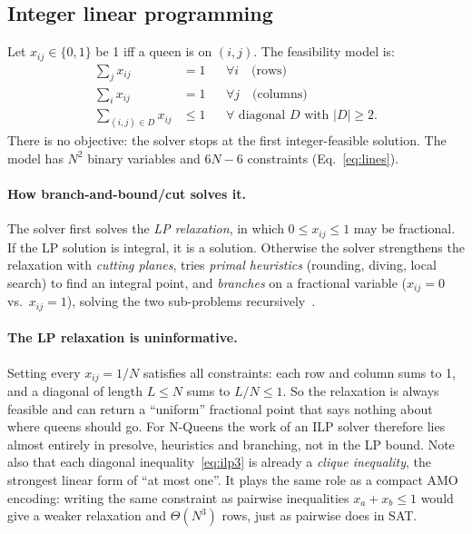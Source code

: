 \subsection{Integer linear programming}
Let $x_{ij}\in\{0,1\}$ be 1 iff a queen is on $(i,j)$. The feasibility model is:
\begin{align}
  \textstyle\sum_{j} x_{ij} &= 1 && \forall i \quad\text{(rows)}\label{eq:ilp1}\\
  \textstyle\sum_{i} x_{ij} &= 1 && \forall j \quad\text{(columns)}\\
  \textstyle\sum_{(i,j)\in D} x_{ij} &\le 1 && \forall \text{ diagonal } D \text{ with } |D|\ge2.\label{eq:ilp3}
\end{align}
There is no objective: the solver stops at the first integer-feasible solution. The model has $N^2$ binary variables and $6N-6$ constraints (Eq.~\eqref{eq:lines}).

\paragraph{How branch-and-bound/cut solves it.}
The solver first solves the \emph{LP relaxation}, in which $0\le x_{ij}\le1$ may be fractional. If the LP solution is integral, it is a solution. Otherwise the solver strengthens the relaxation with \emph{cutting planes}, tries \emph{primal heuristics} (rounding, diving, local search) to find an integral point, and \emph{branches} on a fractional variable ($x_{ij}=0$ vs.\ $x_{ij}=1$), solving the two sub-problems recursively~\cite{wolsey1998}.

\paragraph{The LP relaxation is uninformative.}
Setting every $x_{ij}=1/N$ satisfies all constraints: each row and column sums to 1, and a diagonal of length $L\le N$ sums to $L/N\le1$. So the relaxation is always feasible and can return a ``uniform'' fractional point that says nothing about where queens should go. For N-Queens the work of an ILP solver therefore lies almost entirely in presolve, heuristics and branching, not in the LP bound. Note also that each diagonal inequality~\eqref{eq:ilp3} is already a \emph{clique inequality}, the strongest linear form of ``at most one''. It plays the same role as a compact AMO encoding: writing the same constraint as pairwise inequalities $x_a+x_b\le1$ would give a weaker relaxation and $\Theta(N^3)$ rows, just as pairwise does in SAT.

